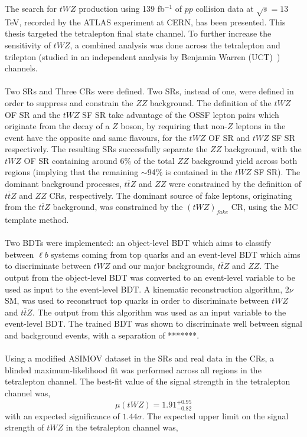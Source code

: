  


The search for $tWZ$ production using 139 fb$^{-1}$ of $pp$ collision data at $\sqrt{s} = 13$ TeV, recorded by the ATLAS experiment at CERN, has been presented. This thesis targeted the tetralepton final state channel. To further increase the sensitivity of $tWZ$, a combined analysis was done across the tetralepton and trilepton (studied in an independent analysis by Benjamin Warren (UCT)~\cite{ben-thesis}) channels.\\\\
Two SRs and Three CRs were defined. Two SRs, instead of one, were defined in order to suppress and constrain the $ZZ$ background. The definition of the $tWZ$ OF SR and the $tWZ$ SF SR take advantage of the OSSF lepton pairs which originate from the decay of a $Z$ boson, by requiring that non-$Z$ leptons in the event have the opposite and same flavours, for the $tWZ$ OF SR and $tWZ$ SF SR respectively. The resulting SRs successfully separate the $ZZ$ background, with the $tWZ$ OF SR containing around 6$\%$ of the total $ZZ$ background yield across both regions (implying that the remaining $\sim$94$\%$ is contained in the $tWZ$ SF SR). The dominant background processes, $t\bar{t}Z $ and $ZZ$ were constrained by the definition of $t\bar{t}Z$ and $ZZ$ CRs, respectively. The dominant source of fake leptons, originating from the $t\bar{t}Z$ background, was constrained by the $(tWZ)_{fake}$ CR, using the MC template method.\\\\
Two BDTs were implemented: an object-level BDT which aims to classify between $\ell b$ systems coming from top quarks and an event-level BDT which aims to discriminate between $tWZ$ and our major backgrounds, $t\bar{t}Z$ and $ZZ$. The output from the object-level BDT was converted to an event-level variable to be used as input to the event-level BDT. A kinematic reconstruction algorithm, 2$\nu$SM, was used to reconstruct top quarks in order to discriminate between $tWZ$ and $t\bar{t}Z$. The output from this algorithm was used as an input variable to the event-level BDT. The trained BDT was shown to discriminate well between signal and background events, with a separation of *******.\\\\
Using a modified ASIMOV dataset in the SRs and real data in the CRs, a blinded maximum-likelihood fit was performed across all regions in the tetralepton channel. The best-fit value of the signal strength in the tetralepton channel was,
\begin{equation}
  \mu (tWZ) =   1.91^{+0.95}_{-0.82}
\end{equation}
with an expected significance of $1.44\sigma$. The expected upper limit on the signal strength of $tWZ$ in the tetralepton channel was,

